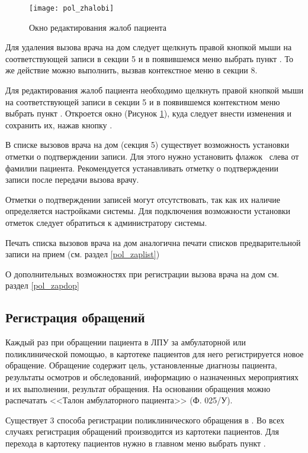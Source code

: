 \begin{figure}[ht]\centering
 \texttt{[image: pol\_zhalobi]}
 \caption{Окно редактирования жалоб пациента}
 \label{img_pol_zhalobi}
\end{figure}

Для удаления вызова врача на дом следует щелкнуть правой кнопкой мыши на соответствующей записи в секции 5 и в появившемся меню выбрать пункт . То же действие можно выполнить, вызвав контекстное меню в секции 8.

Для редактирования жалоб пациента необходимо щелкнуть правой кнопкой мыши на соответствующей записи в секции 5 и в появившемся контекстном меню выбрать пункт . Откроется окно  (Рисунок \ref{img_pol_zhalobi}), куда следует внести изменения и сохранить их, нажав кнопку .

В списке вызовов врача на дом (секция 5) существует возможность установки отметки о подтверждении записи. Для этого нужно установить флажок \putx~слева от фамилии пациента. Рекомендуется устанавливать отметку о подтверждении записи после передачи вызова врачу.

\begin{prim}
 Отметки о подтверждении записей могут отсутствовать, так как их наличие определяется настройками системы. Для подключения возможности установки отметок следует обратиться к администратору системы.
\end{prim}

Печать списка вызовов врача на дом аналогична печати списков предварительной записи на прием (см. раздел \ref{pol_zaplist}) 

О дополнительных возможностях при регистрации вызова врача на дом см. раздел \ref{pol_zapdop}

\subsection {Регистрация обращений} \label{pol_obr}

Каждый раз при обращении пациента в ЛПУ за амбулаторной или поликлинической помощью, в картотеке пациентов для него регистрируется новое обращение. Обращение содержит цель, установленные диагнозы пациента, результаты осмотров и обследований, информацию о назначенных мероприятиях и их выполнении, результат обращения. На основании обращения можно распечатать <<Талон амбулаторного пациента>> (Ф. 025\slash У).

Существует 3 способа регистрации поликлинического обращения в \tmis . Во всех случаях регистрация обращений производится из картотеки пациентов. Для перехода в картотеку пациентов нужно в главном меню выбрать пункт .

